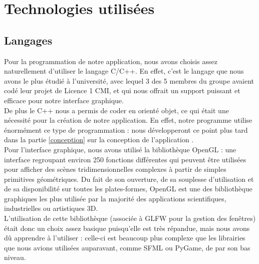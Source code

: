 \documentclass[twoside]{report}
\begin{document}

\chapter{Technologies utilisées}
\section{Langages}
Pour la programmation de notre application, nous avons choisis assez naturellement d'utiliser le langage C/C++. En effet, c'est le langage que nous avons le plus étudié à l'université, avec lequel 3 des 5 membres du groupe avaient codé leur projet de Licence 1 CMI, et qui nous offrait un support puissant et efficace pour notre interface graphique. \\
De plus le C++ nous a permis de coder en orienté objet, ce qui était une nécessité pour la création de notre application. En effet, notre programme utilise énormément ce type de programmation : nous développeront ce point plus tard dans la partie \ref{conception} sur la conception de l'application . \\

Pour l'interface graphique, nous avons utilisé la bibliothèque OpenGL : une interface regroupant environ 250 fonctions différentes qui peuvent être utilisées pour afficher des scènes tridimensionnelles complexes à partir de simples primitives géométriques. Du fait de son ouverture, de sa souplesse d'utilisation et de sa disponibilité sur toutes les plates-formes, OpenGL est une des bibliothèque graphiques les plus utilisée par la majorité des applications scientifiques, industrielles ou artistiques 3D. \\
L'utilisation de cette bibliothèque (associée à GLFW pour la gestion des fenêtres) était donc un choix assez basique puisqu'elle est très répandue, mais nous avons dû apprendre à l'utiliser : celle-ci est beaucoup plus complexe que les librairies que nous avions utilisées auparavant, comme SFML ou PyGame, de par son bas niveau. \\
\end{document}
